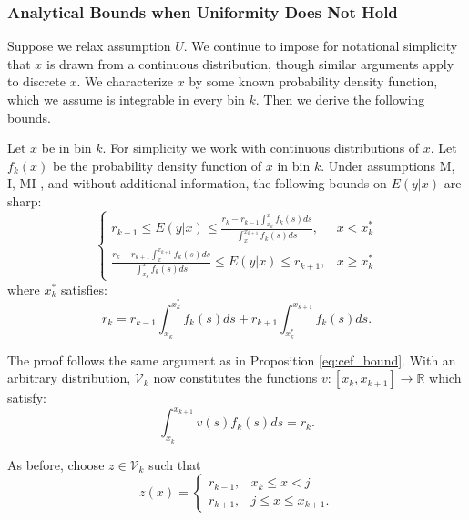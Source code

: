 \vspace{1em}

\vspace{2em}

\subsubsection{Analytical Bounds when Uniformity Does Not Hold} 
Suppose we relax
assumption $U$. We continue to impose for notational simplicity that $x$ is drawn
from a continuous distribution, though similar arguments apply to discrete
$x$. We characterize $x$ by some known probability
density function, which we assume is integrable in every bin
$k$. Then we derive the following bounds. 

\begin{proposition} 
\label{eq:bound_arb_distrib}
Let $x$ be in bin $k$. For simplicity we work with continuous
distributions of $x$. Let $f_k(x)$ be the probability density function
of $x$ in bin $k$. Under assumptions M, I, MI \citep{Manski2002}, and
without additional information, the
following bounds on $E(y \vert x)$ are sharp:
$$
\begin{cases}                                                                                                                          
r_{k-1} \leq E(y \vert x) \leq \frac{r_k - r_{k-1} \int_{x_{k}}^x
  f_k(s)ds}{\int_x^{x_{k+1}}f_k(s)ds}, & x < x_k^*      \\           
\frac{r_k - r_{k+1}\int_x^{x_{k+1}} f_k(s)ds }{\int_{x_k}^x f_k(s)ds}  \leq E(y \vert x)  \leq                                                                         
r_{k+1} , & x \geq x_k^*                                                                                                             
\end{cases}
$$
where $x_k^*$ satisfies: 
$$r_k = r_{k-1} \int_{x_k}^{x_k^*} f_k(s) ds + r_{k+1}
\int_{x_k^*}^{x_{k+1}} f_k(s) ds.$$ 
\end{proposition} 

The proof follows the same argument as in Proposition
\ref{eq:cef_bound}. With an arbitrary distribution, $\mathcal{V}_k$ now
constitutes the functions $v: [x_k,x_{k+1}] \to \mathbb{R}$ which satisfy: 
$$ \int_{x_k}^{x_{k+1}} v(s)f_k(s) ds = r_k.$$ 

As before, choose $z \in \mathcal{V}_k$ such that 
$$
z(x) = \begin{cases} 
r_{k-1}, & x_k \leq x < j \\
r_{k+1}, & j \leq x \leq x_{k+1}. 
\end{cases}
$$

